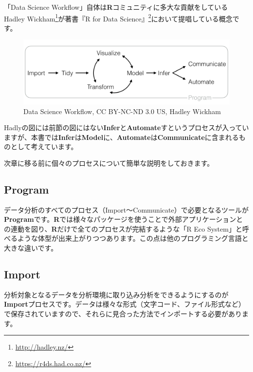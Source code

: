 \documentclass[
  12pt,
]{book}
\DeclareRobustCommand{\href}[2]{#2\footnote{\url{#1}}}
\begin{document}
「Data Science Workflow」自体は\textbf{R}コミュニティに多大な貢献をしている \href{http://hadley.nz/}{Hadley Wickham}が著書\href{https://r4ds.had.co.nz/}{『R for Data Science』}において提唱している概念です。

\begin{figure}[H]

{\centering \includegraphics[width=0.85\linewidth,]{fig/data-science} 

}

\caption{Data Science Workflow, CC BY-NC-ND 3.0 US, Hadley Wickham}\label{fig:unnamed-chunk-13}
\end{figure}

Hadlyの図には前節の図にはない\textbf{Infer}と\textbf{Automate}すというプロセスが入っていますが、本書では\textbf{Infer}は\textbf{Model}に、\textbf{Automate}は\textbf{Communicate}に含まれるものとして考えています。

次章に移る前に個々のプロセスについて簡単な説明をしておきます。

\hypertarget{program}{%
\subsection*{Program}\label{program}}

データ分析のすべてのプロセス（Import〜Communicate）で必要となるツールが\textbf{Program}です。\textbf{R}では様々なパッケージを使うことで外部アプリケーションとの連動を図り、\textbf{R}だけで全てのプロセスが完結するような「R Eco System」と呼べるような体型が出来上がりつつあります。この点は他のプログラミング言語と大きな違いです。

\hypertarget{import}{%
\subsection*{Import}\label{import}}

分析対象となるデータを分析環境に取り込み分析をできるようにするのが\textbf{Import}プロセスです。データは様々な形式（文字コード、ファイル形式など）で保存されていますので、それらに見合った方法でインポートする必要があります。
\end{document}
